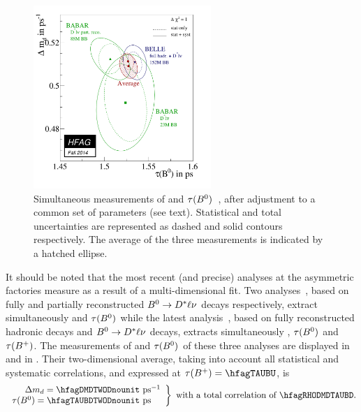 \begin{figure}
\begin{center}
\vspace{-0.5cm}
\includegraphics[width=0.6\textwidth]{figures/life_mix/dmd_taubd}
\vspace{-0.5cm}
\caption{Simultaneous measurements of
\dmd and $\tau(B^0)$~\cite{Aubert:2002sh,Aubert:2005kf,Abe:2004mz}, 
after adjustment to a common set of parameters (see text). 
Statistical and total uncertainties are represented as dashed and
solid contours respectively.
The average of the three measurements
is indicated by a hatched ellipse.}
\end{center}
\end{figure}

It should be noted that the most recent (and precise) analyses at the 
asymmetric \B factories measure \dmd
as a result of a multi-dimensional fit. 
Two \babar analyses~\cite{Aubert:2002sh,Aubert:2005kf},  
based on fully and partially reconstructed $B^0 \to D^*\ell\nu$ decays
respectively, 
extract simultaneously \dmd and $\tau(B^0)$
while the latest \belle analysis~\cite{Abe:2004mz},  %
based on fully reconstructed hadronic \Bd decays and $B^0 \to D^*\ell\nu$ decays, 
extracts simultaneously \dmd, $\tau(B^0)$ and $\tau(B^+)$.
The measurements of \dmd and $\tau(B^0)$ of these three analyses 
are displayed in  and in . Their two-dimensional average, 
taking into account all statistical and systematic correlations, and expressed
at $\tau(\Bu)=\hfagTAUBU$, is
\begin{equation}
\left.
\begin{array}{r@{}l}
\dmd = \hfagDMDTWODnounit & \invps \\
\tau(\Bd) = \hfagTAUBDTWODnounit & \ps
\end{array}
\right\}
~\mbox{with a total correlation of \hfagRHODMDTAUBD.}
\end{equation}

